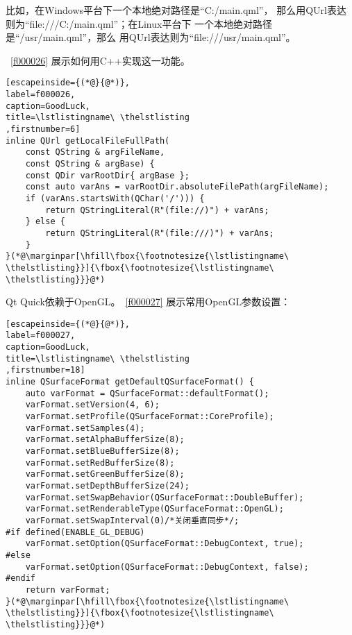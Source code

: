 比如，在Windows平台下一个本地绝对路径是“C:/main.qml”，
那么用QUrl表达则为“file:///C:/main.qml”；在Linux平台下
一个本地绝对路径是“/usr/main.qml”，那么
用QUrl表达则为“file:///usr/main.qml”。

\lstlistingname\ \ref{f000026}
展示如何用C{\sourcefonttwo{}+}{\sourcefonttwo{}+}实现这一功能。

\FloatBarrier
\begin{lstlisting}[escapeinside={(*@}{@*)},
label=f000026,
caption=GoodLuck,
title=\lstlistingname\ \thelstlisting
,firstnumber=6]
inline QUrl getLocalFileFullPath(
    const QString & argFileName,
    const QString & argBase) {
    const QDir varRootDir{ argBase };
    const auto varAns = varRootDir.absoluteFilePath(argFileName);
    if (varAns.startsWith(QChar('/'))) {
        return QStringLiteral(R"(file://)") + varAns;
    } else {
        return QStringLiteral(R"(file:///)") + varAns;
    }
}(*@\marginpar[\hfill\fbox{\footnotesize{\lstlistingname\ \thelstlisting}}]{\fbox{\footnotesize{\lstlistingname\ \thelstlisting}}}@*)\end{lstlisting}          %

Qt Quick依赖于OpenGL。\lstlistingname\ \ref{f000027}
展示常用OpenGL参数设置：

\FloatBarrier
\begin{lstlisting}[escapeinside={(*@}{@*)},
label=f000027,
caption=GoodLuck,
title=\lstlistingname\ \thelstlisting
,firstnumber=18]
inline QSurfaceFormat getDefaultQSurfaceFormat() {
    auto varFormat = QSurfaceFormat::defaultFormat();
    varFormat.setVersion(4, 6);
    varFormat.setProfile(QSurfaceFormat::CoreProfile);
    varFormat.setSamples(4);
    varFormat.setAlphaBufferSize(8);
    varFormat.setBlueBufferSize(8);
    varFormat.setRedBufferSize(8);
    varFormat.setGreenBufferSize(8);
    varFormat.setDepthBufferSize(24);
    varFormat.setSwapBehavior(QSurfaceFormat::DoubleBuffer);
    varFormat.setRenderableType(QSurfaceFormat::OpenGL);
    varFormat.setSwapInterval(0)/*关闭垂直同步*/;
#if defined(ENABLE_GL_DEBUG)
    varFormat.setOption(QSurfaceFormat::DebugContext, true);
#else
    varFormat.setOption(QSurfaceFormat::DebugContext, false);
#endif
    return varFormat;
}(*@\marginpar[\hfill\fbox{\footnotesize{\lstlistingname\ \thelstlisting}}]{\fbox{\footnotesize{\lstlistingname\ \thelstlisting}}}@*)\end{lstlisting}          %

